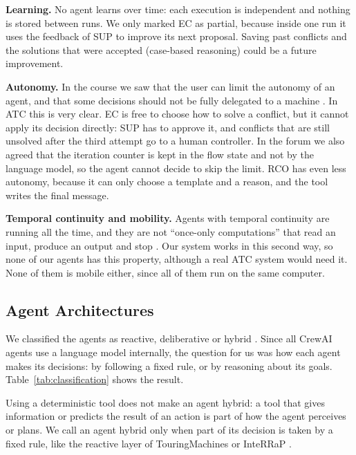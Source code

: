 \textbf{Learning.} No agent learns over time: each execution is independent and nothing is
stored between runs. We only marked EC as partial, because inside one run it uses the
feedback of SUP to improve its next proposal. Saving past conflicts and the solutions that
were accepted (case-based reasoning) could be a future improvement.

\textbf{Autonomy.} In the course we saw that the user can limit the autonomy of an agent,
and that some decisions should not be fully delegated to a machine \cite{lecture3}. In ATC
this is very clear. EC is free to choose how to solve a conflict, but it cannot apply its
decision directly: SUP has to approve it, and conflicts that are still unsolved after the third
attempt go to a human controller. In the forum we also agreed that the iteration counter
is kept in the flow state and not by the language model, so the agent cannot decide to
skip the limit. RCO has even less autonomy, because it can only choose a template and a
reason, and the tool writes the final message.

\textbf{Temporal continuity and mobility.} Agents with temporal continuity are running all
the time, and they are not ``once-only computations'' that read an input, produce an
output and stop \cite{lecture3}. Our system works in this second way, so none of our
agents has this property, although a real ATC system would need it. None of them is mobile
either, since all of them run on the same computer.

\subsection{Agent Architectures}
\label{sec:architectures}

We classified the agents as reactive, deliberative or hybrid \cite{lecture2}. Since all
CrewAI agents use a language model internally, the question for us was how each agent
makes its decisions: by following a fixed rule, or by reasoning about its goals.
Table~\ref{tab:classification} shows the result.

Using a deterministic tool does not make an agent hybrid: a tool that gives information or
predicts the result of an action is part of how the agent perceives or plans. We call an
agent hybrid only when part of its decision is taken by a fixed rule, like the reactive
layer of TouringMachines or InteRRaP \cite{ferguson1992, muller1996}.

